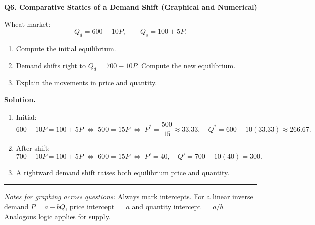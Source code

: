 \documentclass[11pt]{article}
\newcommand{\eq}{\Leftrightarrow}
\begin{document}
\bigskip

\noindent \textbf{Q6. Comparative Statics of a Demand Shift (Graphical and Numerical)}

Wheat market:
\[
Q_d=600-10P,\qquad Q_s=100+5P.
\]
\begin{enumerate}[label=(\alph*)]
\item Compute the initial equilibrium.
\item Demand shifts right to \(Q_d=700-10P\). Compute the new equilibrium.
\item Explain the movements in price and quantity.
\end{enumerate}

\textbf{Solution.}
\begin{enumerate}[label=(\alph*)]
\item Initial:
\[
600-10P=100+5P \;\eq\; 500=15P \;\eq\; P^\ast=\frac{500}{15}\approx 33.33, \quad Q^\ast=600-10(33.33)\approx 266.67.
\]
\item After shift:
\[
700-10P=100+5P \;\eq\; 600=15P \;\eq\; P' = 40,\quad Q' = 700-10(40)=300.
\]
\item A rightward demand shift raises both equilibrium price and quantity.
\end{enumerate}

\bigskip
\hrule
\bigskip

\textit{Notes for graphing across questions:} Always mark intercepts. For a linear inverse demand \(P=a-bQ\), price intercept \(=a\) and quantity intercept \(=a/b\). Analogous logic applies for supply.
\end{document}

